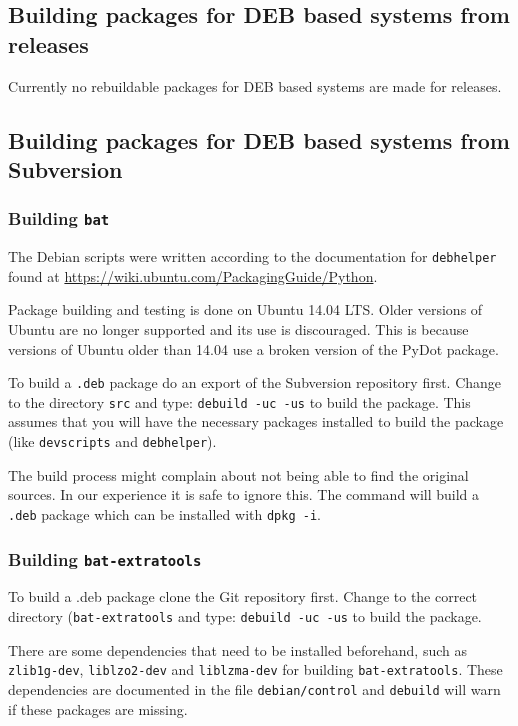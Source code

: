 \documentclass[10pt,a4paper]{article}
\begin{document}
\subsection{Building packages for DEB based systems from releases}

Currently no rebuildable packages for DEB based systems are made for releases.

\subsection{Building packages for DEB based systems from Subversion}

\subsubsection{Building \texttt{bat}}

The Debian scripts were written according to the documentation for
\texttt{debhelper} found at \url{https://wiki.ubuntu.com/PackagingGuide/Python}.

Package building and testing is done on Ubuntu 14.04 LTS. Older versions of
Ubuntu are no longer supported and its use is discouraged. This is because
versions of Ubuntu older than 14.04 use a broken version of the PyDot package.

To build a \texttt{.deb} package do an export of the Subversion repository
first.  Change to the directory \texttt{src} and type:
\texttt{debuild -uc -us} to build the package. This assumes that you will have
the necessary packages installed to build the package (like \texttt{devscripts}
and \texttt{debhelper}).

The build process might complain about not being able to find the original
sources. In our experience it is safe to ignore this. The command will build a
\texttt{.deb} package which can be installed with \texttt{dpkg -i}.

\subsubsection{Building \texttt{bat-extratools}}

To build a .deb package clone the Git repository first. Change
to the correct directory (\texttt{bat-extratools} and type:
\texttt{debuild -uc -us} to build the package.

There are some dependencies that need to be installed beforehand, such as
\texttt{zlib1g-dev}, \texttt{liblzo2-dev} and \texttt{liblzma-dev} for building
\texttt{bat-extratools}. These dependencies are documented in the file
\texttt{debian/control} and \texttt{debuild} will warn if these packages are
missing.
\end{document}
